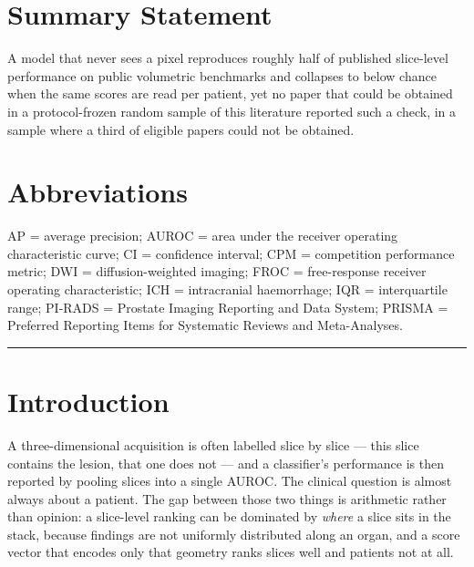 \documentclass[11pt,a4paper]{article}
\begin{document}
\section*{Summary Statement}

A model that never sees a pixel reproduces roughly half of published
slice-level performance on public volumetric benchmarks and collapses to below
chance when the same scores are read per patient, yet no paper that could be
obtained in a protocol-frozen random sample of this literature reported such a
check, in a sample where a third of eligible papers could not be obtained.

\section*{Abbreviations}

AP = average precision;
AUROC = area under the receiver operating characteristic curve;
CI = confidence interval;
CPM = competition performance metric;
DWI = diffusion-weighted imaging;
FROC = free-response receiver operating characteristic;
ICH = intracranial haemorrhage;
IQR = interquartile range;
PI-RADS = Prostate Imaging Reporting and Data System;
PRISMA = Preferred Reporting Items for Systematic Reviews and Meta-Analyses.

\vspace{0.4em}
\hrule
\vspace{0.4em}

\section{Introduction}

A three-dimensional acquisition is often labelled slice by slice --- this slice
contains the lesion, that one does not --- and a classifier's performance is then
reported by pooling slices into a single AUROC. The clinical question is almost
always about a patient. The gap between those two things is arithmetic rather
than opinion: a slice-level ranking can be dominated by \emph{where} a slice sits
in the stack, because findings are not uniformly distributed along an organ, and
a score vector that encodes only that geometry ranks slices well and patients
not at all.
\end{document}
